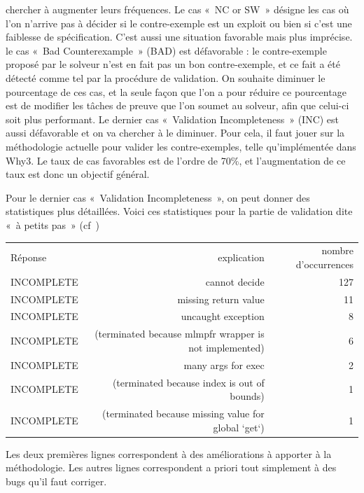 \documentclass[a4paper,11pt]{article}
\begin{document}
chercher à augmenter leurs fréquences. Le cas «~NC or SW~» désigne les cas où l'on
n'arrive pas à décider si le contre-exemple est un exploit ou bien si c'est une
faiblesse de spécification. C'est aussi une situation favorable mais plus
imprécise. le cas «~Bad Counterexample~» (BAD) est défavorable : le contre-exemple
proposé par le solveur n'est en fait pas un bon contre-exemple, et ce fait a été
détecté comme tel par la procédure de validation. On souhaite diminuer le
pourcentage de ces cas, et la seule façon que l'on a pour réduire ce pourcentage
est de modifier les tâches de preuve que l'on soumet au solveur, afin que
celui-ci soit plus performant. Le dernier cas «~Validation Incompleteness~»
(INC) est aussi défavorable et on va chercher à le diminuer. Pour cela, il faut
jouer sur la méthodologie actuelle pour valider les contre-exemples, telle
qu'implémentée dans Why3.  Le taux de cas favorables est de l'ordre de 70\%, et
l'augmentation de ce taux est donc un objectif général.

Pour le dernier cas «~Validation Incompleteness~», on peut donner des
statistiques plus détaillées. Voici ces statistiques pour la partie de
validation dite «~à petits pas~» (cf~\cite{becker21fide})
  \begin{center}
  \begin{tabular}{|l|r|r|}
    \hline
    \rowcolor{gray!50} Réponse
  & \multicolumn{1}{p{0.65\textwidth}|}{explication}
  & \multicolumn{1}{p{0.13\textwidth}|}{nombre d'occurrences}
    \\
INCOMPLETE & cannot decide	& 127 \\
INCOMPLETE & missing return value & 11 \\
INCOMPLETE & uncaught exception	& 8 \\
INCOMPLETE & (terminated because mlmpfr wrapper is not implemented) & 6 \\
INCOMPLETE & many args for exec	& 2 \\
INCOMPLETE & (terminated because index is out of bounds) & 1 \\
    INCOMPLETE & (terminated because missing value for global `get`) & 1 \\
    \hline
\end{tabular}
\end{center}
Les deux premières lignes correspondent à des améliorations à apporter
à la méthodologie. Les autres lignes correspondent a priori tout
simplement à des bugs qu'il faut corriger.
\end{document}
